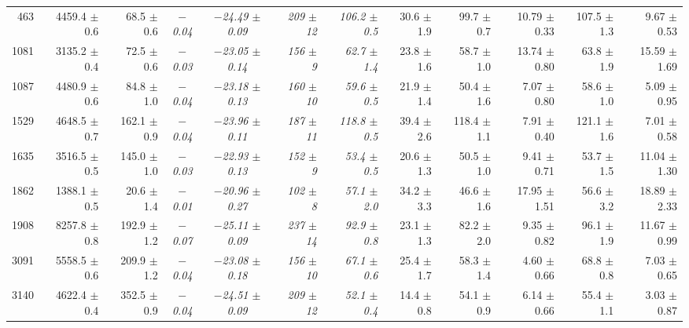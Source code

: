 \begin{table}
{\begin{tabular}{|rrrccrrrrrrr|}
   463 &  4459.4 $\pm$ 0.6 &  68.5 $\pm$ 0.6 &{\it $-$0.04}&{\it $-$24.49 $\pm$ 0.09}&{\it 209 $\pm$           12}&{\it 106.2 $\pm$ 0.5}& 30.6 $\pm$ 1.9  &  99.7 $\pm$ 0.7 & 10.79 $\pm$ 0.33 & 107.5 $\pm$ \phantom{1}1.3 &  9.67 $\pm$ \phantom{1}0.53  \\
  1081 &  3135.2 $\pm$ 0.4 &  72.5 $\pm$ 0.6 &{\it $-$0.03}&{\it $-$23.05 $\pm$ 0.14}&{\it 156 $\pm$ \phantom{1}9}&{\it  62.7 $\pm$ 1.4}& 23.8 $\pm$ 1.6  &  58.7 $\pm$ 1.0 & 13.74 $\pm$ 0.80 &  63.8 $\pm$ \phantom{1}1.9 & 15.59 $\pm$ \phantom{1}1.69  \\
  1087 &  4480.9 $\pm$ 0.6 &  84.8 $\pm$ 1.0 &{\it $-$0.04}&{\it $-$23.18 $\pm$ 0.13}&{\it 160 $\pm$           10}&{\it  59.6 $\pm$ 0.5}& 21.9 $\pm$ 1.4  &  50.4 $\pm$ 1.6 &  7.07 $\pm$ 0.80 &  58.6 $\pm$ \phantom{1}1.0 &  5.09 $\pm$ \phantom{1}0.95  \\
  1529 &  4648.5 $\pm$ 0.7 & 162.1 $\pm$ 0.9 &{\it $-$0.04}&{\it $-$23.96 $\pm$ 0.11}&{\it 187 $\pm$           11}&{\it 118.8 $\pm$ 0.5}& 39.4 $\pm$ 2.6  & 118.4 $\pm$ 1.1 &  7.91 $\pm$ 0.40 & 121.1 $\pm$ \phantom{1}1.6 &  7.01 $\pm$ \phantom{1}0.58  \\
  1635 &  3516.5 $\pm$ 0.5 & 145.0 $\pm$ 1.0 &{\it $-$0.03}&{\it $-$22.93 $\pm$ 0.13}&{\it 152 $\pm$ \phantom{1}9}&{\it  53.4 $\pm$ 0.5}& 20.6 $\pm$ 1.3  &  50.5 $\pm$ 1.0 &  9.41 $\pm$ 0.71 &  53.7 $\pm$ \phantom{1}1.5 & 11.04 $\pm$ \phantom{1}1.30  \\
  1862 &  1388.1 $\pm$ 0.5 &  20.6 $\pm$ 1.4 &{\it $-$0.01}&{\it $-$20.96 $\pm$ 0.27}&{\it 102 $\pm$ \phantom{1}8}&{\it  57.1 $\pm$ 2.0}& 34.2 $\pm$ 3.3  &  46.6 $\pm$ 1.6 & 17.95 $\pm$ 1.51 &  56.6 $\pm$ \phantom{1}3.2 & 18.89 $\pm$ \phantom{1}2.33  \\
  1908 &  8257.8 $\pm$ 0.8 & 192.9 $\pm$ 1.2 &{\it $-$0.07}&{\it $-$25.11 $\pm$ 0.09}&{\it 237 $\pm$           14}&{\it  92.9 $\pm$ 0.8}& 23.1 $\pm$ 1.3  &  82.2 $\pm$ 2.0 &  9.35 $\pm$ 0.82 &  96.1 $\pm$ \phantom{1}1.9 & 11.67 $\pm$ \phantom{1}0.99  \\
  3091 &  5558.5 $\pm$ 0.6 & 209.9 $\pm$ 1.2 &{\it $-$0.04}&{\it $-$23.08 $\pm$ 0.18}&{\it 156 $\pm$           10}&{\it  67.1 $\pm$ 0.6}& 25.4 $\pm$ 1.7  &  58.3 $\pm$ 1.4 &  4.60 $\pm$ 0.66 &  68.8 $\pm$ \phantom{1}0.8 &  7.03 $\pm$ \phantom{1}0.65  \\
  3140 &  4622.4 $\pm$ 0.4 & 352.5 $\pm$ 0.9 &{\it $-$0.04}&{\it $-$24.51 $\pm$ 0.09}&{\it 209 $\pm$           12}&{\it  52.1 $\pm$ 0.4}& 14.4 $\pm$ 0.8  &  54.1 $\pm$ 0.9 &  6.14 $\pm$ 0.66 &  55.4 $\pm$ \phantom{1}1.1 &  3.03 $\pm$ \phantom{1}0.87  \\

\end{tabular}}
\end{table}
